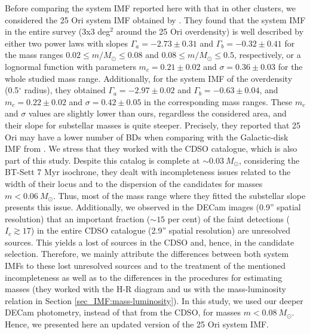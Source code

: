 \documentclass[12pt]{article}
\newcounter{subsubsubsection}[subsubsection]
\begin{document}
\label{sec_IMF:imf_comparison}
Before comparing the system IMF reported here with that in other clusters, we considered the 25 Ori system IMF obtained by \citet{Downes2014}. They found that the system IMF in the entire survey (3x3 deg$^2$ around the 25 Ori overdensity) is well described by either two power laws with slopes $\Gamma_a=-2.73\pm0.31$ and $\Gamma_b=-0.32\pm0.41$ for the mass ranges $0.02\le m/M_\odot\le0.08$ and $0.08\le m/M_\odot\le0.5$, respectively, or a lognormal function with parameters $m_c=0.21\pm0.02$ and $\sigma=0.36\pm0.03$ for the whole studied mass range. Additionally, for the system IMF of the overdensity (0.5$^\circ$ radius), they obtained $\Gamma_a=-2.97\pm0.02$ and $\Gamma_b=-0.63\pm0.04$, and $m_c=0.22\pm0.02$ and $\sigma=0.42\pm0.05$ in the corresponding mass ranges. These $m_c$ and $\sigma$ values are slightly lower than ours, regardless the considered area, and their slope for substellar masses is quite steeper. Precisely, they reported that 25 Ori may have a lower number of BDs when comparing with the Galactic-disk IMF from \citet{Chabrier2003b}. We stress that they worked with the CDSO catalogue, which is also part of this study. Despite this catalog is complete at $\sim0.03\ M_\odot$, considering the BT-Sett 7 Myr isochrone, they dealt with incompleteness issues related to the width of their locus and to the dispersion of the candidates for masses $m<0.06\ M_\odot$. Thus, most of the mass range where they fitted the substellar slope presents this issue. 
Additionally, we observed in the DECam images (0.9'' spatial resolution) that an important fraction ($\sim15$ per cent) of the faint detections ($I_c\gtrsim17$) in the entire CDSO catalogue (2.9'' spatial resolution) are unresolved sources. This yields a lost of sources in the CDSO and, hence, in the candidate selection. Therefore, we mainly attribute the differences between both system IMFs to these lost unresolved sources and to the treatment of the mentioned incompleteness as well as to the differences in the procedures for estimating masses (they worked with the H-R diagram and us with the mass-luminosity relation in Section \ref{sec_IMF:mass-luminosity}). In this study, we used our deeper DECam photometry, instead of that from the CDSO, for masses $m<0.08\ M_\odot$. Hence, we presented here an updated version of the 25 Ori system IMF.
\end{document}
